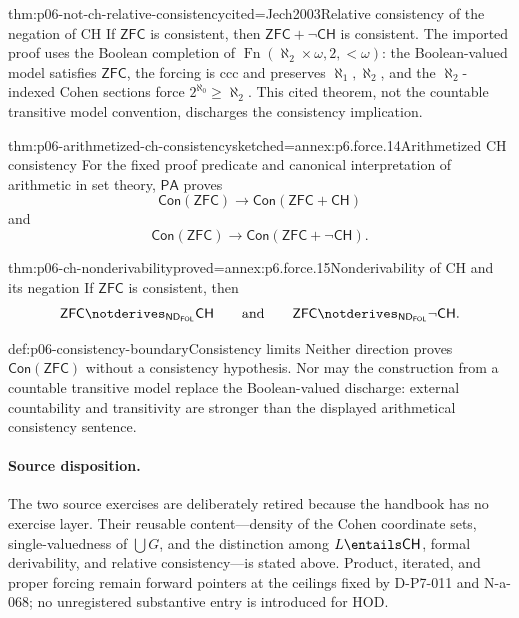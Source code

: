 \begin{hbtheorem}{thm:p06-not-ch-relative-consistency}{cited=Jech2003}{Relative consistency of the negation of CH}
If \(\mathsf{ZFC}\) is consistent, then
\(\mathsf{ZFC}+\neg\mathsf{CH}\) is consistent.  The imported proof uses the
Boolean completion of
\(\operatorname{Fn}(\aleph_2\times\omega,2,{<}\omega)\): the Boolean-valued
model satisfies \(\mathsf{ZFC}\), the forcing is ccc and preserves
\(\aleph_1,\aleph_2\), and the \(\aleph_2\)-indexed Cohen sections force
\(2^{\aleph_0}\geq\aleph_2\).  This cited theorem, not the countable
transitive model convention, discharges the consistency implication.
\end{hbtheorem}

\begin{hbtheorem}{thm:p06-arithmetized-ch-consistency}{sketched=annex:p6.force.14}{Arithmetized CH consistency}
For the fixed proof predicate and canonical interpretation of arithmetic in
set theory, \(\mathsf{PA}\) proves
\[
  \mathsf{Con}(\mathsf{ZFC})\to
  \mathsf{Con}(\mathsf{ZFC}+\mathsf{CH})
\]
and
\[
  \mathsf{Con}(\mathsf{ZFC})\to
  \mathsf{Con}(\mathsf{ZFC}+\neg\mathsf{CH}).
\]
\end{hbtheorem}

\begin{hbtheorem}{thm:p06-ch-nonderivability}{proved=annex:p6.force.15}{Nonderivability of CH and its negation}
If \(\mathsf{ZFC}\) is consistent, then
\[
  \mathsf{ZFC}\notderives_{\mathsf{ND}_{\mathsf{FOL}}}\mathsf{CH}
  \qquad\text{and}\qquad
  \mathsf{ZFC}\notderives_{\mathsf{ND}_{\mathsf{FOL}}}\neg\mathsf{CH}.
\]
\end{hbtheorem}

\begin{hbwarning}{def:p06-consistency-boundary}{Consistency limits}
Neither direction proves \(\mathsf{Con}(\mathsf{ZFC})\) without a consistency
hypothesis.  Nor may the construction from a countable transitive model
replace the Boolean-valued discharge: external countability and transitivity
are stronger than the displayed arithmetical consistency sentence.
\end{hbwarning}

\paragraph{Source disposition.}
The two source exercises are deliberately retired because the handbook has no
exercise layer.  Their reusable content---density of the Cohen coordinate
sets, single-valuedness of \(\bigcup G\), and the distinction among
\(L\entails\mathsf{CH}\), formal derivability, and relative
consistency---is stated above.  Product, iterated, and proper forcing remain
forward pointers at the ceilings fixed by D-P7-011 and N-a-068; no
unregistered substantive entry is introduced for HOD.
